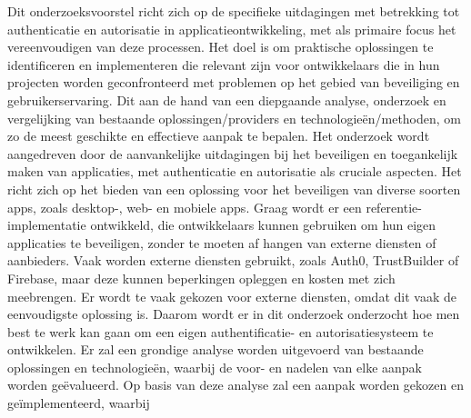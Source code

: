 Dit onderzoeksvoorstel richt zich op de specifieke uitdagingen met betrekking tot authenticatie en autorisatie in applicatieontwikkeling, met als primaire 
focus het vereenvoudigen van deze processen. Het doel is om praktische oplossingen te identificeren en implementeren die relevant zijn voor ontwikkelaars 
die in hun projecten worden geconfronteerd met problemen op het gebied van beveiliging en gebruikerservaring. Dit aan de hand van een diepgaande analyse,
onderzoek en vergelijking van bestaande oplossingen/providers en technologieën/methoden, om zo de meest geschikte en effectieve aanpak te bepalen. 
\newline
\newline
Het onderzoek wordt aangedreven door de aanvankelijke uitdagingen bij het beveiligen en toegankelijk maken van applicaties, met authenticatie en 
autorisatie als cruciale aspecten. Het richt zich op het bieden van een oplossing voor het beveiligen van diverse soorten apps, zoals desktop-, 
web- en mobiele apps. Graag wordt er een referentie-implementatie ontwikkeld, die ontwikkelaars kunnen gebruiken om hun eigen applicaties te beveiligen,
zonder te moeten af hangen van externe diensten of aanbieders. Vaak worden externe diensten gebruikt, zoals Auth0, TrustBuilder of Firebase, maar deze
kunnen beperkingen opleggen en kosten met zich meebrengen. Er wordt te vaak gekozen voor externe diensten, omdat dit vaak de eenvoudigste oplossing is.
Daarom wordt er in dit onderzoek onderzocht hoe men best te werk kan gaan om een eigen authentificatie- en autorisatiesysteem te ontwikkelen.
\newline
\newline
Er zal een grondige analyse worden uitgevoerd van bestaande oplossingen en technologieën,
waarbij de voor- en nadelen van elke aanpak worden geëvalueerd. Op basis van deze analyse zal een aanpak worden gekozen en geïmplementeerd, waarbij
